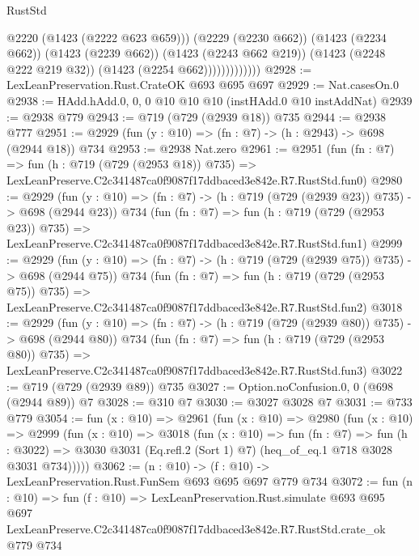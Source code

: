 \begin{lexlean}{RustStd}
\begin{coremodule}
                            @2220
                            (@1423 (@2222 @623 @659)))
                          (@2229 (@2230 @662))
                          (@1423 (@2234 @662))
                          (@1423 (@2239 @662))
                          (@1423 (@2243 @662 @219))
                          (@1423 (@2248 @222 @219 @32))
                          (@1423 (@2254 @662)))))))))))))
@2928 := LexLeanPreservation.Rust.CrateOK @693 @695 @697
@2929 := Nat.casesOn.{0}
@2938 := HAdd.hAdd.{0, 0, 0} @10 @10 @10 (instHAdd.{0} @10 instAddNat)
@2939 := @2938 @779
@2943 := @719 (@729 (@2939 @18)) @735
@2944 := @2938 @777
@2951 := @2929 (fun (y : @10) => (fn : @7) -> (h : @2943) -> @698 (@2944 @18)) @734
@2953 := @2938 Nat.zero
@2961 := @2951
    (fun (fn : @7) =>
    fun (h : @719 (@729 (@2953 @18)) @735) =>
    LexLeanPreserve.C2c341487ca0f9087f17ddbaced3e842e.R7.RustStd.fun0)
@2980 := @2929
    (fun (y : @10) => (fn : @7) -> (h : @719 (@729 (@2939 @23)) @735) -> @698 (@2944 @23))
    @734
    (fun (fn : @7) =>
    fun (h : @719 (@729 (@2953 @23)) @735) =>
    LexLeanPreserve.C2c341487ca0f9087f17ddbaced3e842e.R7.RustStd.fun1)
@2999 := @2929
    (fun (y : @10) => (fn : @7) -> (h : @719 (@729 (@2939 @75)) @735) -> @698 (@2944 @75))
    @734
    (fun (fn : @7) =>
    fun (h : @719 (@729 (@2953 @75)) @735) =>
    LexLeanPreserve.C2c341487ca0f9087f17ddbaced3e842e.R7.RustStd.fun2)
@3018 := @2929
    (fun (y : @10) => (fn : @7) -> (h : @719 (@729 (@2939 @80)) @735) -> @698 (@2944 @80))
    @734
    (fun (fn : @7) =>
    fun (h : @719 (@729 (@2953 @80)) @735) =>
    LexLeanPreserve.C2c341487ca0f9087f17ddbaced3e842e.R7.RustStd.fun3)
@3022 := @719 (@729 (@2939 @89)) @735
@3027 := Option.noConfusion.{0, 0} (@698 (@2944 @89)) @7
@3028 := @310 @7
@3030 := @3027 @3028 @7
@3031 := @733 @779
@3054 := fun (x : @10) =>
  @2961
    (fun (x : @10) =>
    @2980
      (fun (x : @10) =>
      @2999
        (fun (x : @10) =>
        @3018
          (fun (x : @10) =>
          fun (fn : @7) =>
          fun (h : @3022) =>
          @3030 @3031 (Eq.refl.{2} (Sort 1) @7) (heq_of_eq.{1} @718 @3028 @3031 @734)))))
@3062 := (n : @10) -> (f : @10) -> LexLeanPreservation.Rust.FunSem @693 @695 @697 @779 @734
@3072 := fun (n : @10) =>
  fun (f : @10) =>
  LexLeanPreservation.Rust.simulate
    @693
    @695
    @697
    LexLeanPreserve.C2c341487ca0f9087f17ddbaced3e842e.R7.RustStd.crate_ok
    @779
    @734
\end{coremodule}
\end{lexlean}
